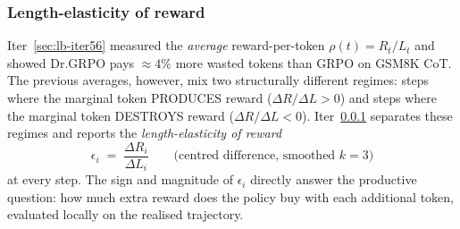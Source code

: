 
\subsubsection{Length-elasticity of reward}\label{sec:lb-iter60}

Iter~\ref{sec:lb-iter56} measured the \emph{average} reward-per-token
$\rho(t) = R_t / L_t$ and showed Dr.GRPO pays $\approx 4\%$ more wasted
tokens than GRPO on GSM8K CoT. The previous averages, however, mix two
structurally different regimes: steps where the marginal token PRODUCES
reward ($\Delta R / \Delta L > 0$) and steps where the marginal token
DESTROYS reward ($\Delta R / \Delta L < 0$). Iter~\ref{sec:lb-iter60}
separates these regimes and reports the \emph{length-elasticity of
reward}
\begin{equation}\label{eq:lb60-elasticity}
\epsilon_i \;=\; \frac{\Delta R_i}{\Delta L_i} \qquad\text{(centred difference, smoothed $k{=}3$)}
\end{equation}
at every step. The sign and magnitude of $\epsilon_i$ directly answer
the productive question: how much extra reward does the policy buy with
each additional token, evaluated locally on the realised trajectory.


